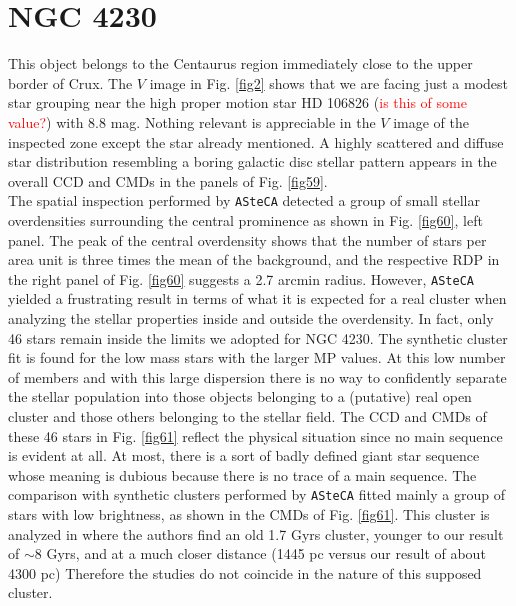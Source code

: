 \documentclass[draft]{aa}
\begin{document}
\section{NGC 4230}

This object belongs to the Centaurus region immediately close to the upper
border of Crux. The $V$ image in Fig. \ref{fig2} shows that we are facing just a
modest star grouping near the high proper motion star HD 106826
(\textcolor{red}{is this of some value?}) with 8.8 mag. Nothing relevant is
appreciable in the $V$ image of the inspected zone except the star already
mentioned. A highly scattered and diffuse star distribution resembling a boring
galactic disc stellar pattern appears in the overall CCD and CMDs in the panels
of Fig. \ref{fig59}.\\

The spatial inspection performed by \texttt{ASteCA} detected a group of small
stellar overdensities surrounding the central prominence as shown in Fig.
\ref{fig60}, left panel. The peak of the central overdensity shows that the
number of stars per area unit is three times the mean of the background, and the
respective RDP in the right panel of Fig. \ref{fig60} suggests a 2.7 arcmin
radius.
However, \texttt{ASteCA} yielded a frustrating result in terms of what
it is expected for a real cluster when analyzing the stellar properties inside
and outside the overdensity. In fact, only 46 stars remain inside the limits we
adopted for NGC 4230. The synthetic cluster fit is found for the low mass stars
with the larger MP values. At this low number of members and with this large
dispersion there is no way to confidently separate the stellar population into
those objects belonging to a (putative) real open cluster and those others
belonging to the stellar field. The CCD and CMDs of these 46 stars in Fig. 
\ref{fig61} reflect the physical situation since no main
sequence is evident at all. At most, there is a sort of badly defined giant
star sequence whose meaning is dubious because there is no trace of a main
sequence. The comparison with synthetic clusters performed by \texttt{ASteCA}
fitted mainly a group of stars with low brightness, as shown in the CMDs of
Fig. \ref{fig61}. This cluster is analyzed in \cite{Tadross_2011} where the
authors find an old 1.7 Gyrs cluster, younger to our result of $\sim$8 Gyrs,
and at a much closer distance (1445 pc versus our result of about 4300 pc)
Therefore the studies do not coincide in the nature of this supposed cluster.\\
\end{document}
